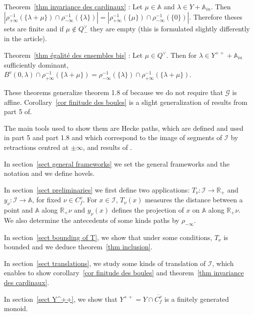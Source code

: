 \documentclass[12pt]{article}
\theoremstyle{plain}
\theoremstyle{definition}
\newcommand{\R}{\mathbb{R}}
\newcommand{\A}{\mathbb{A}}
\newcommand{\I}{\mathcal{I}}
\begin{document}
\vspace{3mm}
Theorem~\ref{thm invariance des cardinaux} : 
Let $\mu\in \A$ and $\lambda\in Y+\A_{in}$. Then $|\rho_{+\infty}^{-1}(\{\lambda+\mu\})\cap\rho_{-\infty}^{-1}(\{\lambda\})|=|\rho_{+\infty}^{-1}(\{\mu\})\cap\rho_{-\infty}^{-1}(\{0\})|$. Therefore theses sets are finite and if $\mu\notin Q^\vee_-$ they are empty (this is formulated slightly differently in the article).

\vspace{3mm}
Theorem~\ref{thm égalité des ensembles bis} :
 Let $\mu\in Q^\vee$. Then for $\lambda\in Y^{++}+\A_{in}$ sufficiently dominant, $B^v(0,\lambda)\cap \rho_{+\infty}^{-1}(\{\lambda+\mu\})=\rho_{-\infty}^{-1}(\{\lambda\})\cap\rho_{+\infty}^{-1}(\{\lambda+\mu\})$.
\vspace{3mm}

These theorems generalize theorem 1.8 of \cite{braverman2014affine} because we do not require that $\mathcal{G}$ is affine. Corollary~\ref{cor finitude des boules} is a slight generalization of results from part 5 of\cite{gaussent2008kac}.
\vspace{3mm}


The main tools used to show them are Hecke paths, which are defined and used in \cite{gaussent2008kac} part 5 and \cite{gaussent2014spherical} part 1.8 and which correspond to the image of segments of $\mathcal{I}$ by retractions centred at $\pm\infty$, and results of \cite{gaussent2014spherical}.

In section~\ref{sect general frameworks} we set the general frameworks and the notation and we define hovels.

 In section~\ref{sect preliminaries} we first define two applications: $T_\nu:\I\rightarrow\R_+$ and $y_\nu:\I\rightarrow \A$, for fixed $\nu\in C_f^v$. For $x\in\I$, $T_\nu(x)$ measures the distance between a point and $\A$ along $\R_+\nu$ and $y_\nu(x)$ defines the projection of $x$ on $\A$ along $\R_+\nu$. We also determine the antecedents of some kinds paths by $\rho_{-\infty}$. 
 
 In section~\ref{sect bounding of T}, we show that under some conditions, $T_\nu$ is bounded and we deduce theorem~\ref{thm inclusion}. 
 
 In section~\ref{sect translations}, we study some kinds of translation of $\I$, which enables to show corollary~\ref{cor finitude des boules} and theorem~\ref{thm invariance des cardinaux}.
 
 In section~\ref{sect Y^++}, we show that $Y^{++}=Y\cap \overline{C_f^v}$ is a finitely generated monoid.
 
\end{document}
